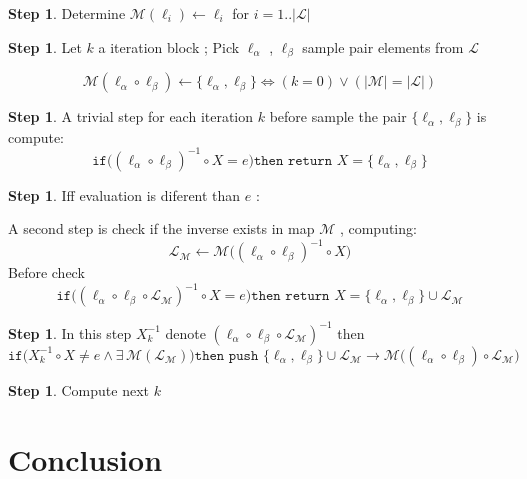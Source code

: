 \documentclass[11pt]{amsart}
\theoremstyle{plain}
\theoremstyle{definition}
\newtheorem{step}[theorem]{Step}
\begin{document}
\begin{step}
Determine $\mathcal M(\ell_i) \leftarrow \ell_i$ for $i=1..|\mathcal L|$
\end{step}

\begin{step}
	Let $k$ a iteration block ; Pick $\ell_\alpha$ , $\ell_\beta$ sample pair elements from $\mathcal L$ 
	
	$$
	\mathcal M(\ell_\alpha \circ \ell_\beta) 
		\leftarrow 
			\{ \ell_\alpha , \ell_\beta \} 
		\iff
		(k=0) 
		\lor
			(|\mathcal M| = |\mathcal L| )
	$$

	
\end{step}
\begin{step}
		A trivial step for each iteration $k$ before sample the pair $\{ \ell_\alpha , \ell_\beta \}$ is compute: 
		$$
		\texttt{if}
		\Big(
			(\ell_\alpha \circ \ell_\beta)^{-1} 
			\circ X = e 
		\Big) 
		\texttt{then return }
			X=  \{ \ell_\alpha , \ell_\beta \}	
		$$
\end{step}

\begin{step}
	Iff evaluation is diferent than $e$ :
	 
	A second step is check if the inverse exists in map $\mathcal M$ , computing: $$\mathcal L_\mathcal M \leftarrow 
	\mathcal M
	\Big(
		(\ell_\alpha \circ \ell_\beta)^{-1} 
		\circ X
	\Big)$$
	Before check
	$$
	\texttt{if}
	\Big((\ell_\alpha \circ \ell_\beta\circ\mathcal L_\mathcal M)^{-1} \circ X = e 
	\Big) \texttt{then return }X=  \{ \ell_\alpha , \ell_\beta \}	\cup \mathcal L_\mathcal M
	$$	
\end{step}

\begin{step}
	In this step $X_k^{-1}$ denote $(\ell_\alpha \circ \ell_\beta\circ\mathcal L_\mathcal M)^{-1}$
	then
		$$
		\texttt{if}
		\Big(
			X_k^{-1} \circ X \neq e 
			\land
			\exists \,
\mathcal M (\mathcal L_\mathcal M)			
		\Big) 
		\texttt{then push }
		\{ \ell_\alpha , \ell_\beta \}
		\cup
		\mathcal L_\mathcal M 
		\rightarrow
		\mathcal M
		\Big(
			( \ell_\alpha \circ \ell_\beta )
		\circ 
			\mathcal L_\mathcal M 
		\Big)
		$$
\end{step}
\begin{step}
	Compute next $k$
\end{step}
\section{Conclusion}

\cite{cite:30}


\begin{footnotesize}


\end{footnotesize}
\end{document}
